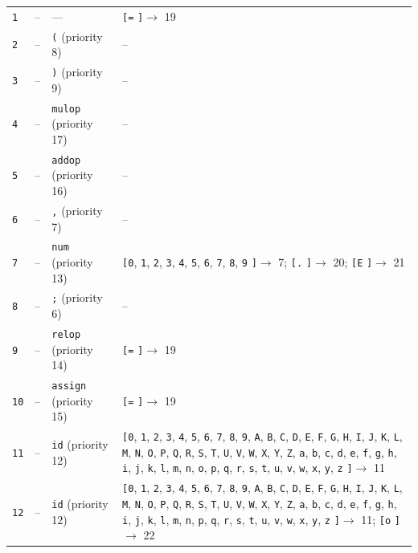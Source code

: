\documentclass[11pt,a4paper]{article}
\newcommand{\opensymbolset}{\texttt{[}}
\newcommand{\closesymbolset}{\texttt{]}}
\begin{document}
\begin{landscape}
\begin{longtable}{
    >{\centering\arraybackslash}p{0.8cm}
    >{\centering\arraybackslash}p{0.7cm}
    >{\raggedright\arraybackslash}p{3.7cm}
    >{\raggedright\arraybackslash}p{18.1cm}
}
\texttt{1} & -- & --- & \opensymbolset \texttt{=} \closesymbolset $\to$ 19 \\
\texttt{2} & -- & \texttt{(} (priority 8) & -- \\
\texttt{3} & -- & \texttt{)} (priority 9) & -- \\
\texttt{4} & -- & \texttt{mulop} (priority 17) & -- \\
\texttt{5} & -- & \texttt{addop} (priority 16) & -- \\
\texttt{6} & -- & \texttt{,} (priority 7) & -- \\
\texttt{7} & -- & \texttt{num} (priority 13) & \opensymbolset \texttt{0}, \texttt{1}, \texttt{2}, \texttt{3}, \texttt{4}, \texttt{5}, \texttt{6}, \texttt{7}, \texttt{8}, \texttt{9} \closesymbolset $\to$ 7; \opensymbolset \texttt{.} \closesymbolset $\to$ 20; \opensymbolset \texttt{E} \closesymbolset $\to$ 21 \\
\texttt{8} & -- & \texttt{;} (priority 6) & -- \\
\texttt{9} & -- & \texttt{relop} (priority 14) & \opensymbolset \texttt{=} \closesymbolset $\to$ 19 \\
\texttt{10} & -- & \texttt{assign} (priority 15) & \opensymbolset \texttt{=} \closesymbolset $\to$ 19 \\
\texttt{11} & -- & \texttt{id} (priority 12) & \opensymbolset \texttt{0}, \texttt{1}, \texttt{2}, \texttt{3}, \texttt{4}, \texttt{5}, \texttt{6}, \texttt{7}, \texttt{8}, \texttt{9}, \texttt{A}, \texttt{B}, \texttt{C}, \texttt{D}, \texttt{E}, \texttt{F}, \texttt{G}, \texttt{H}, \texttt{I}, \texttt{J}, \texttt{K}, \texttt{L}, \texttt{M}, \texttt{N}, \texttt{O}, \texttt{P}, \texttt{Q}, \texttt{R}, \texttt{S}, \texttt{T}, \texttt{U}, \texttt{V}, \texttt{W}, \texttt{X}, \texttt{Y}, \texttt{Z}, \texttt{a}, \texttt{b}, \texttt{c}, \texttt{d}, \texttt{e}, \texttt{f}, \texttt{g}, \texttt{h}, \texttt{i}, \texttt{j}, \texttt{k}, \texttt{l}, \texttt{m}, \texttt{n}, \texttt{o}, \texttt{p}, \texttt{q}, \texttt{r}, \texttt{s}, \texttt{t}, \texttt{u}, \texttt{v}, \texttt{w}, \texttt{x}, \texttt{y}, \texttt{z} \closesymbolset $\to$ 11 \\
\texttt{12} & -- & \texttt{id} (priority 12) & \opensymbolset \texttt{0}, \texttt{1}, \texttt{2}, \texttt{3}, \texttt{4}, \texttt{5}, \texttt{6}, \texttt{7}, \texttt{8}, \texttt{9}, \texttt{A}, \texttt{B}, \texttt{C}, \texttt{D}, \texttt{E}, \texttt{F}, \texttt{G}, \texttt{H}, \texttt{I}, \texttt{J}, \texttt{K}, \texttt{L}, \texttt{M}, \texttt{N}, \texttt{O}, \texttt{P}, \texttt{Q}, \texttt{R}, \texttt{S}, \texttt{T}, \texttt{U}, \texttt{V}, \texttt{W}, \texttt{X}, \texttt{Y}, \texttt{Z}, \texttt{a}, \texttt{b}, \texttt{c}, \texttt{d}, \texttt{e}, \texttt{f}, \texttt{g}, \texttt{h}, \texttt{i}, \texttt{j}, \texttt{k}, \texttt{l}, \texttt{m}, \texttt{n}, \texttt{p}, \texttt{q}, \texttt{r}, \texttt{s}, \texttt{t}, \texttt{u}, \texttt{v}, \texttt{w}, \texttt{x}, \texttt{y}, \texttt{z} \closesymbolset $\to$ 11; \opensymbolset \texttt{o} \closesymbolset $\to$ 22 \\

\end{longtable}
\end{landscape}
\end{document}
